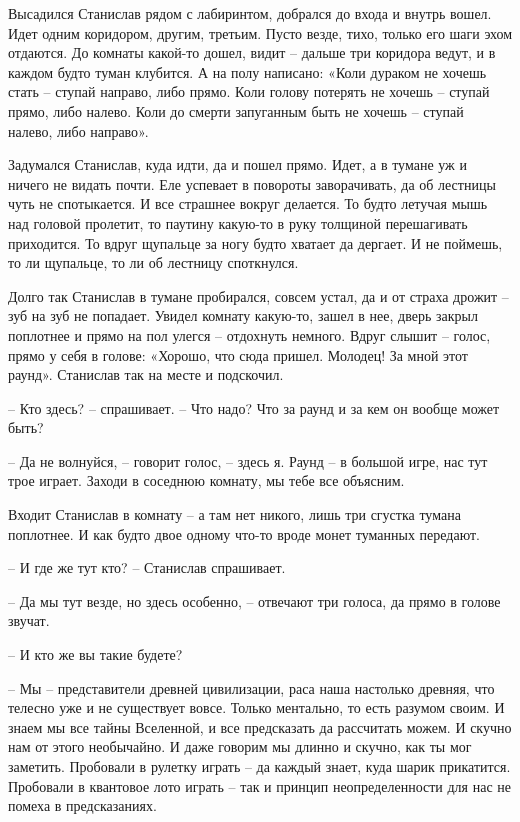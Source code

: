 \documentclass[ebook,oneside,final,openright]{memoir}
\begin{document}
\par
Высадился Станислав рядом с лабиринтом, добрался до входа и внутрь вошел. Идет одним коридором, другим, третьим. Пусто везде, тихо, только его шаги эхом отдаются. До комнаты какой-то дошел, видит – дальше три коридора ведут, и в каждом будто туман клубится. А на полу написано: «Коли дураком не хочешь стать – ступай направо, либо прямо. Коли голову потерять не хочешь – ступай прямо, либо налево. Коли до смерти запуганным быть не хочешь – ступай налево, либо направо».\par
\par
Задумался Станислав, куда идти, да и пошел прямо. Идет, а в тумане уж и ничего не видать почти. Еле успевает в повороты заворачивать, да об лестницы чуть не спотыкается. И все страшнее вокруг делается. То будто летучая мышь над головой пролетит, то паутину какую-то в руку толщиной перешагивать приходится. То вдруг щупальце за ногу будто хватает да дергает. И не поймешь, то ли щупальце, то ли об лестницу споткнулся.\par
\par
Долго так Станислав в тумане пробирался, совсем устал, да и от страха дрожит – зуб на зуб не попадает. Увидел комнату какую-то, зашел в нее, дверь закрыл поплотнее и прямо на пол улегся – отдохнуть немного. Вдруг слышит – голос, прямо у себя в голове: «Хорошо, что сюда пришел. Молодец! За мной этот раунд». Станислав так на месте и подскочил. \par
\par
– Кто здесь? – спрашивает. – Что надо? Что за раунд и за кем он вообще может быть?\par
– Да не волнуйся, – говорит голос, – здесь я. Раунд – в большой игре, нас тут трое играет. Заходи в соседнюю комнату, мы тебе все объясним.\par
 \par
Входит Станислав в комнату – а там нет никого, лишь три сгустка тумана поплотнее. И как будто двое одному что-то вроде монет туманных передают.\par
– И где же тут кто? – Станислав спрашивает.\par
– Да мы тут везде, но здесь особенно, – отвечают три голоса, да прямо в голове звучат.\par
– И кто же вы такие будете?\par
– Мы – представители древней цивилизации, раса наша настолько древняя, что телесно уже и не существует вовсе. Только ментально, то есть разумом своим. И знаем мы все тайны Вселенной, и все предсказать да рассчитать можем. И скучно нам от этого необычайно. И даже говорим мы длинно и скучно, как ты мог заметить. Пробовали в рулетку играть – да каждый знает, куда шарик прикатится. Пробовали в квантовое лото играть – так и принцип неопределенности для нас не помеха в предсказаниях.\par
\end{document}
